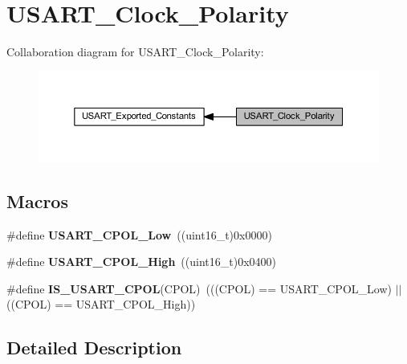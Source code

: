 \hypertarget{group___u_s_a_r_t___clock___polarity}{}\section{U\+S\+A\+R\+T\+\_\+\+Clock\+\_\+\+Polarity}
\label{group___u_s_a_r_t___clock___polarity}
Collaboration diagram for U\+S\+A\+R\+T\+\_\+\+Clock\+\_\+\+Polarity\+:\nopagebreak
\begin{figure}[H]
\begin{center}
\leavevmode
\includegraphics[width=350pt]{group___u_s_a_r_t___clock___polarity}
\end{center}
\end{figure}
\subsection*{Macros}
\begin{DoxyCompactItemize}
\item 
\mbox{\label{group___u_s_a_r_t___clock___polarity_ga194d60b47d8042d39e843c52f3a6aa1a}} 
\#define {\bfseries U\+S\+A\+R\+T\+\_\+\+C\+P\+O\+L\+\_\+\+Low}~((uint16\+\_\+t)0x0000)
\item 
\mbox{\label{group___u_s_a_r_t___clock___polarity_ga4ba6946dd9f0b4fd38115f24798c210f}} 
\#define {\bfseries U\+S\+A\+R\+T\+\_\+\+C\+P\+O\+L\+\_\+\+High}~((uint16\+\_\+t)0x0400)
\item 
\mbox{\label{group___u_s_a_r_t___clock___polarity_ga833e9d2e85ab84658c7a7c18bd0bc8b9}} 
\#define {\bfseries I\+S\+\_\+\+U\+S\+A\+R\+T\+\_\+\+C\+P\+OL}(C\+P\+OL)~(((C\+P\+OL) == U\+S\+A\+R\+T\+\_\+\+C\+P\+O\+L\+\_\+\+Low) $\vert$$\vert$ ((C\+P\+OL) == U\+S\+A\+R\+T\+\_\+\+C\+P\+O\+L\+\_\+\+High))
\end{DoxyCompactItemize}


\subsection{Detailed Description}
